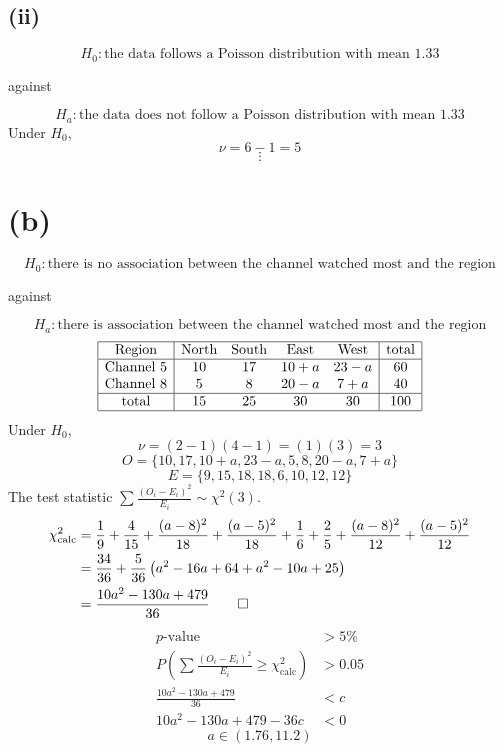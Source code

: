 \documentclass[a4paper]{article}
\newcommand{\pp}{p\text{-value}}
\begin{document}
\subsection*{(ii)}
\[H_0:\text{the data follows a Poisson distribution with mean 1.33}\]
\begin{center}against\end{center}
\[H_a:\text{the data does not follow a Poisson distribution with mean 1.33}\]
Under \(H_0\),
\[\nu=6-1=5\]
\[\vdots\]

\section*{(b)}
\[H_0:\text{there is no association between the channel watched most and the region}\]
\begin{center}against\end{center}
\[H_a:\text{there is association between the channel watched most and the region}\]
\[\begin{array}{|c|cccc|c|}
    \hline
    \text{Region}       &\text{North}   &\text{South}   &\text{East}    &\text{West}    &\text{total}\\
    \hline
    \text{Channel 5}    &10             &17             &10+a           &23-a           &60\\
    \text{Channel 8}    &5              &8              &20-a           &7+a            &40\\
    \hline
    \text{total}        &15             &25             &30             &30             &100\\
    \hline
\end{array}\]
Under \(H_0\),
\[\nu=(2-1)(4-1)=(1)(3)=3\]
\[O=\{10,17,10+a,23-a,5,8,20-a,7+a\}\]
\[E=\{9,15,18,18,6,10,12,12\}\]
The test statistic \(\sum\frac{(O_i-E_i)^2}{E_i}\sim\chi^2(3)\).
\[\begin{aligned}
    \chi^2_\text{calc}&=\frac19+\frac4{15}+\frac{(a-8)^2}{18}+\frac{(a-5)^2}{18}+\frac16+\frac25+\frac{(a-8)^2}{12}+\frac{(a-5)^2}{12}\\
    &=\frac{34}{36}+\frac5{36}\left(a^2-16a+64+a^2-10a+25\right)\\
    &=\frac{10a^2-130a+479}{36}\qed
\end{aligned}\]
\[\begin{aligned}
    \pp&>5\%\\
    P\left(\sum\frac{(O_i-E_i)^2}{E_i}\geqslant\chi^2_\text{calc}\right)&>0.05\\
    \frac{10a^2-130a+479}{36}&<c\\
    10a^2-130a+479-36c&<0
\end{aligned}\]
\[a\in(1.76,11.2)\]
\end{document}
